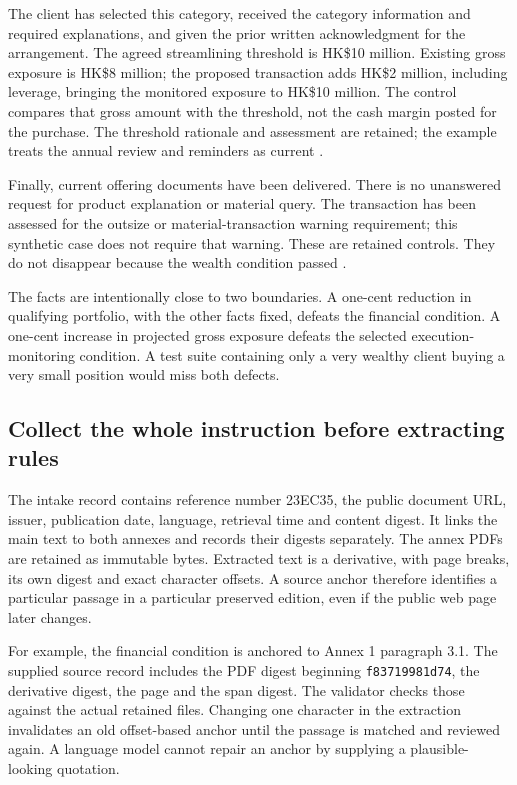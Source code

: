 The client has selected this category, received the category information and
required explanations, and given the prior written acknowledgment for the
arrangement. The agreed streamlining threshold is HK\$10 million. Existing
gross exposure is HK\$8 million; the proposed transaction adds HK\$2 million,
including leverage, bringing the monitored exposure to HK\$10 million. The
control compares that gross amount with the threshold, not the cash margin
posted for the purchase. The threshold rationale and assessment are retained;
the example treats the annual review and reminders as current
\citep[Annex 1, paras.~6--8, 12--14; Annex 2, FAQ~7]{sfcspiannex1,sfcspiannex2}.

Finally, current offering documents have been delivered. There is no unanswered
request for product explanation or material query. The transaction has been
assessed for the outsize or material-transaction warning requirement; this
synthetic case does not require that warning. These are retained controls.
They do not disappear because the wealth condition passed
\citep[Annex 1, paras.~8.4, 10.3]{sfcspiannex1}.

The facts are intentionally close to two boundaries. A one-cent reduction in
qualifying portfolio, with the other facts fixed, defeats the financial
condition. A one-cent increase in projected gross exposure defeats the selected
execution-monitoring condition. A test suite containing only a very wealthy
client buying a very small position would miss both defects.

\subsection{Collect the whole instruction before extracting rules}

The intake record contains reference number 23EC35, the public document URL,
issuer, publication date, language, retrieval time and content digest. It
links the main text to both annexes and records their digests separately.
The annex PDFs are retained as immutable bytes. Extracted text is a derivative,
with page breaks, its own digest and exact character offsets. A source anchor
therefore identifies a particular passage in a particular preserved edition,
even if the public web page later changes.

For example, the financial condition is anchored to Annex 1 paragraph 3.1.
The supplied source record includes the PDF digest beginning
\texttt{f83719981d74}, the derivative digest, the page and the span digest.
The validator checks those against the actual retained files. Changing one
character in the extraction invalidates an old offset-based anchor until the
passage is matched and reviewed again. A language model cannot repair an anchor
by supplying a plausible-looking quotation.

